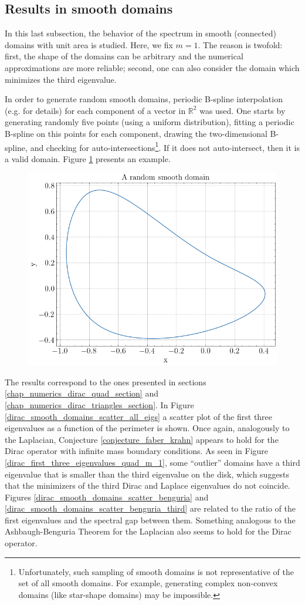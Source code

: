 \subsection{Results in smooth domains}

In this last subsection, the behavior of the spectrum in smooth (connected) domains with unit area is studied. Here, we fix \(m=1\). The reason is twofold: first, the shape of the domains can be arbitrary and the numerical approximations are more reliable; second, one can also consider the domain which minimizes the third eigenvalue.

In order to generate random smooth domains, periodic B-spline interpolation (e.g. \cite{de1978practical} for details) for each component of a vector in \(\mathbb{R}^2\) was used. One starts by generating randomly five points (using a uniform distribution), fitting a periodic B-spline on this points for each component, drawing the two-dimensional B-spline, and checking for auto-intersections\footnote{Unfortunately, such sampling of smooth domains is not representative of the set of all smooth domains. For example, generating complex non-convex domains (like star-shape domains) may be impossible.}. If it does not auto-intersect, then it is a valid domain. Figure \ref{dirac_smooth_random_domain} presents an example.

\begin{figure}[!htb]
    \centering
    \includegraphics[width=0.55\linewidth]{Images/Dirac/smooth/random_smooth_domain.png}
    \label{dirac_smooth_random_domain}
\end{figure}

The results correspond to the ones presented in sections \ref{chap_numerics_dirac_quad_section} and \ref{chap_numerics_dirac_triangles_section}. In Figure \ref{dirac_smooth_domains_scatter_all_eigs} a scatter plot of the first three eigenvalues as a function of the perimeter is shown. Once again, analogously to the Laplacian, Conjecture \ref{conjecture_faber_krahn} appears to hold for the Dirac operator with infinite mass boundary conditions. As seen in Figure \ref{dirac_first_three_eigenvalues_quad_m_1}, some ``outlier'' domains have a third eigenvalue that is smaller than the third eigenvalue on the disk, which suggests that the minimizers of the third Dirac and Laplace eigenvalues do not coincide.
Figures \ref{dirac_smooth_domains_scatter_benguria} and \ref{dirac_smooth_domains_scatter_benguria_third} are related to the ratio of the first eigenvalues and the spectral gap between them. Something analogous to the Ashbaugh-Benguria Theorem for the Laplacian also seems to hold for the Dirac operator.

